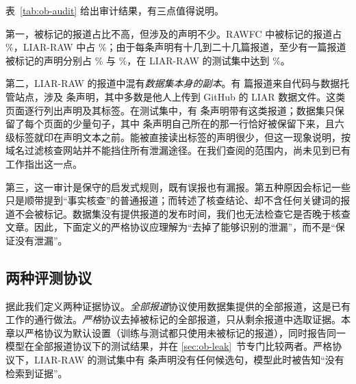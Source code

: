 \begin{table}[htbp]
\centering\small
\caption{两个数据集中被标记的报道及其涉及的声明}\label{tab:ob-audit}
\end{table}

表~\ref{tab:ob-audit} 给出审计结果，有三点值得说明。

第一，被标记的报道占比不高，但涉及的声明不少。RAWFC 中被标记的报道占 \%，LIAR-RAW 中占 \%；由于每条声明有十几到二十几篇报道，至少有一篇报道被标记的声明分别占 \% 与 \%，在 LIAR-RAW 的测试集中达到 \%。

第二，LIAR-RAW 的报道中混有\emph{数据集本身的副本}。有  篇报道来自代码与数据托管站点，涉及  条声明，其中多数是他人上传到 GitHub 的 LIAR 数据文件。这类页面逐行列出声明及其标签。在测试集中，有  条声明带有这类报道；数据集只保留了每个页面的少量句子，其中  条声明自己所在的那一行恰好被保留下来，且六级标签就印在声明文本之前。能被直接读出标签的声明很少，但这一现象说明，按域名过滤核查网站并不能挡住所有泄漏途径。在我们查阅的范围内，尚未见到已有工作指出这一点。

第三，这一审计是保守的启发式规则，既有误报也有漏报。第五种原因会标记一些只是顺带提到“事实核查”的普通报道；而转述了核查结论、却不含任何关键词的报道不会被标记\citep{glockner2022missing}。数据集没有提供报道的发布时间，我们也无法检查它是否晚于核查文章。因此，下面定义的严格协议应理解为“去掉了能够识别的泄漏”，而不是“保证没有泄漏”。

\subsection{两种评测协议}

据此我们定义两种证据协议。\emph{全部报道}协议使用数据集提供的全部报道，这是已有工作的通行做法。\emph{严格}协议去掉被标记的全部报道，只从剩余报道中选取证据。本章以严格协议为默认设置（训练与测试都只使用未被标记的报道），同时报告同一模型在全部报道协议下的测试结果，并在 \ref{sec:ob-leak}~节专门比较两者。严格协议下，LIAR-RAW 的测试集中有  条声明没有任何候选句，模型此时被告知“没有检索到证据”。

